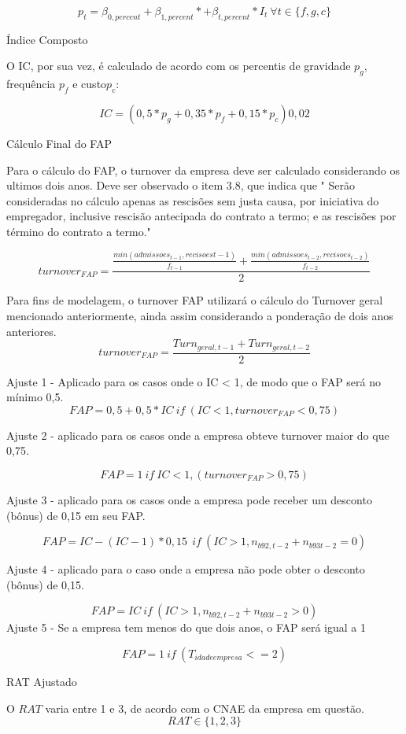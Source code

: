 \documentclass[]{article}
\begin{document}
\[p_t = \beta_{0,percent} + \beta_{1,percent} *  +\beta_{t,percent} * I_t \ \forall t \in \{f,g,c\}\]

Índice Composto

O IC, por sua vez, é calculado de acordo com os percentis de gravidade
\(p_g\), frequência \(p_{f}\) e custo\(p_c\):

\[IC = (0,5*p_g + 0,35*p_{f}+0,15*p_c)0,02\]

Cálculo Final do FAP

Para o cálculo do FAP, o turnover da empresa deve ser calculado
considerando os ultimos dois anos. Deve ser observado o item 3.8, que
indica que " Serão consideradas no cálculo apenas as rescisões sem justa
causa, por iniciativa do empregador, inclusive rescisão antecipada do
contrato a termo; e as rescisões por término do contrato a termo."

\[turnover_{FAP} = \frac{\frac{min(admissoes_{t-1}, recisoes{t-1})}{f_{t-1}} + \frac{min(admissoes_{t-2}, recisoes_{t-2})}{f_{t-2}}}{2}\]

Para fins de modelagem, o turnover FAP utilizará o cálculo do Turnover
geral mencionado anteriormente, ainda assim considerando a ponderação de
dois anos anteriores.
\[turnover_{FAP} = \frac{Turn_{geral,t-1} + Turn_{geral,t-2}}{2}\]

Ajuste 1 - Aplicado para os casos onde o IC \textless{} 1, de modo que o
FAP será no mínimo 0,5.
\[FAP = 0,5 + 0,5 * IC \ if \ (IC < 1, turnover_{FAP} < 0,75) \]

Ajuste 2 - aplicado para os casos onde a empresa obteve turnover maior
do que 0,75.

\[FAP = 1 \ if \ IC < 1, (turnover_{FAP} > 0,75)\]

Ajuste 3 - aplicado para os casos onde a empresa pode receber um
desconto (bônus) de 0,15 em seu FAP.

\[FAP = IC - (IC-1)*0,15 \ \ if \ (IC > 1, n_{b92,t-2}+n_{b93t-2} = 0)\]

Ajuste 4 - aplicado para o caso onde a empresa não pode obter o desconto
(bônus) de 0,15.

\[FAP = IC  \ if \ (IC > 1, n_{b92,t-2}+n_{b93t-2} > 0) \] Ajuste 5 - Se
a empresa tem menos do que dois anos, o FAP será igual a 1

\[FAP = 1  \ if \ (T_{idadeempresa} <= 2) \]

RAT Ajustado

O \(RAT\) varia entre 1 e 3, de acordo com o CNAE da empresa em questão.
\[RAT \in \{1,2,3\}\]
\end{document}
